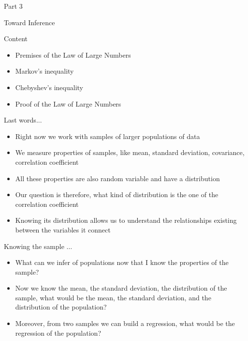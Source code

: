 \documentclass{beamer}
\begin{document}
\begin{frame}
{\centerline{Part 3}}

\begin{center}
\Huge Toward Inference
\end{center}
\end{frame}

\begin{frame}
{\centerline{Content}}

\begin{itemize}
\item Premises of the Law of Large Numbers
\item Markov's inequality
\item Chebyshev’s inequality
\item Proof of the Law of Large Numbers
\end{itemize}


\end{frame}


\begin{frame}
{\centerline{Last words...}}

\begin{itemize}
\item Right now we work with samples of larger populations of data
\item We measure properties of samples, like mean, standard deviation, covariance, correlation coefficient
\item All these properties are also random variable and have a distribution
\item Our question is therefore, what kind of distribution is the one of the correlation coefficient
\item Knowing its distribution allows us to understand the relationships existing between the variables it connect
\end{itemize}


\end{frame}

\begin{frame}
{\centerline{Knowing the sample $\ldots$}}

\begin{itemize}
\item What can we infer of populations now that I know the properties of the sample?
\item Now we know the mean, the standard deviation, the distribution of the sample, what would be the mean, the standard deviation, and the distribution of the population?
\item Moreover, from two samples we can build a regression, what would be the regression of the population? 
\end{itemize}

\end{frame}
\end{document}

